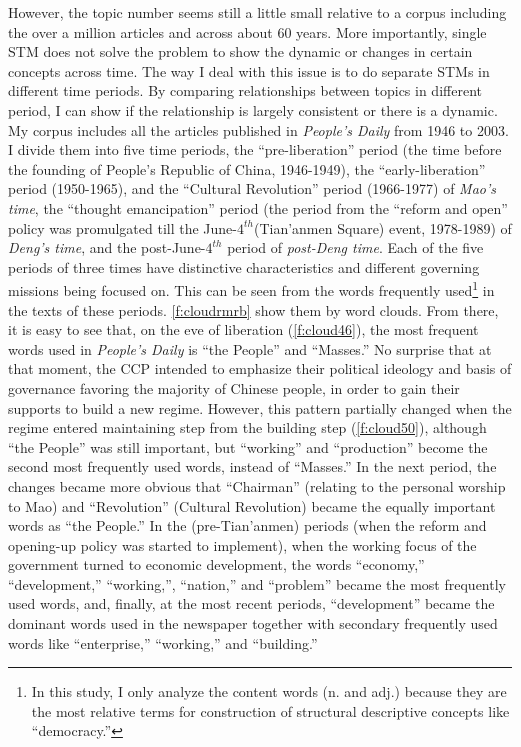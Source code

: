\documentclass[abstracton,UTF8]{ctexart}
\begin{document}
However, the topic number seems still a little small relative to a corpus including the over a million articles and across about 60 years. More importantly, single STM does not solve the problem to show the dynamic or changes in certain concepts across time. The way I deal with this issue is to do separate STMs in different time periods. By comparing relationships between topics in different period, I can show if the relationship is largely consistent or there is a dynamic. My corpus includes all the articles published in \textit{People's Daily} from 1946 to 2003. I divide them into five time periods, the ``pre-liberation'' period (the time before the founding of People's Republic of China, 1946-1949), the ``early-liberation'' period (1950-1965), and the ``Cultural Revolution'' period (1966-1977) of \textit{Mao's time}, the ``thought emancipation'' period (the period from the ``reform and open'' policy was promulgated till the June-$ 4^{th} $(Tian'anmen Square) event, 1978-1989) of \textit{Deng's time}, and the post-June-$ 4^{th} $ period of \textit{post-Deng time}. Each of the five periods of three times have distinctive characteristics and different governing missions being focused on. This can be seen from the words frequently used\footnote{In this study, I only analyze the content words (n. and adj.) because they are the most relative terms for construction of structural descriptive concepts like ``democracy.''} in the texts of these periods. \cref{f:cloudrmrb} show them by word clouds. From there, it is easy to see that, on the eve of liberation (\cref{f:cloud46}), the most frequent words used in \textit{People's Daily} is ``the People'' and ``Masses.'' No surprise that at that moment, the CCP intended to emphasize their political ideology and basis of governance favoring the majority of Chinese people, in order to gain their supports to build a new regime. However, this pattern partially changed when the regime entered maintaining step from the building step (\cref{f:cloud50}), although ``the People'' was still important, but ``working'' and ``production'' become the second most frequently used words, instead of ``Masses.'' In the next period, the changes became more obvious that ``Chairman'' (relating to the personal worship to Mao) and ``Revolution'' (Cultural Revolution) became the equally important words as ``the People.'' In the (pre-Tian'anmen) periods (when the reform and opening-up policy was started to implement), when the working focus of the government turned to economic development, the words ``economy,'' ``development,'' ``working,'', ``nation,'' and ``problem'' became the most frequently used words, and, finally, at the most recent periods, ``development'' became the dominant words used in the newspaper together with secondary frequently used words like ``enterprise,'' ``working,'' and ``building.''
\end{document}

